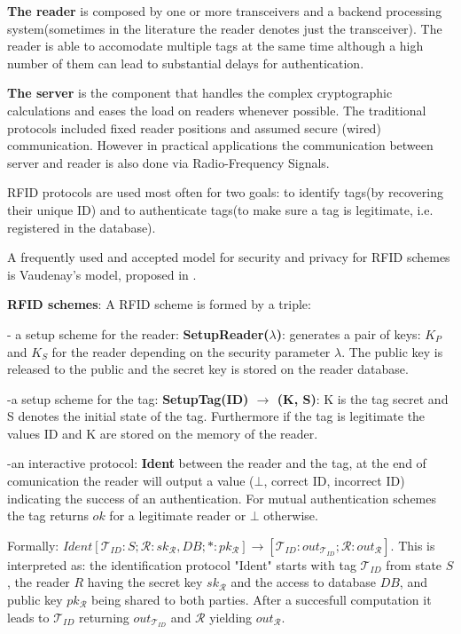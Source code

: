        \textbf{The reader} is composed by one or more transceivers and a backend processing system(sometimes in the literature the reader denotes just the transceiver). 
    The reader is able to accomodate multiple tags at the same time although a high number of them can lead to substantial delays for authentication. 
    
        \textbf{The server} is the component that handles the complex cryptographic calculations and eases the load on readers whenever possible. The traditional protocols
    included fixed reader positions and assumed secure (wired) communication. However in practical applications the communication between server and reader is also done via 
    Radio-Frequency Signals.

        RFID protocols are used most often for two goals: to identify tags(by recovering their unique ID) and to authenticate tags(to make sure a tag is legitimate, i.e. registered in 
    the database). 

        A frequently used and accepted model for security and privacy for RFID schemes is Vaudenay's
    model, proposed in \cite{Vaudenay}. 

    \textbf{RFID schemes}: A RFID scheme is formed by a triple:

    - a setup scheme for the reader: \textbf{SetupReader($\lambda$)}: generates a pair of keys: $K_P$ and 
    $K_S$ for the reader depending on the security parameter $\lambda$. The public key is released
    to the public and the secret key is stored on the reader database.

    -a setup scheme for the tag: \textbf{SetupTag(ID) $\rightarrow$ (K, S)}: K is the tag secret and S denotes the 
    initial state of the tag. Furthermore if the tag is legitimate the values ID and K are stored
    on the memory of the reader.
    
    -an interactive protocol: \textbf{Ident} between the reader and the tag, at the end of comunication the reader
    will output a value ($\bot$, correct ID, incorrect ID) indicating the success of an authentication. For mutual authentication
    schemes the tag returns $ok$ for a legitimate reader or $\bot$ otherwise. 
    
    Formally: $Ident[\mathcal{T}_{ID}:S; \mathcal{R}: sk_{\mathcal{R}}, DB; *:pk_{\mathcal{R}}] \rightarrow 
    [\mathcal{T}_{ID}:out_{\mathcal{T}_{ID}}; \mathcal{R}:out_{\mathcal{R}}]$. This is interpreted as:
    the identification protocol "Ident" starts with tag $\mathcal{T}_{ID}$ from state $S$, the reader $R$ having the secret key 
    $sk_{\mathcal{R}}$ and the access to database $DB$, and public key $pk_{\mathcal{R}}$ being shared to both parties. After a 
    succesfull computation it leads to $\mathcal{T}_{ID}$ returning $out_{\mathcal{T}_{ID}}$ and $\mathcal{R}$ yielding $out_{\mathcal{R}}$.

